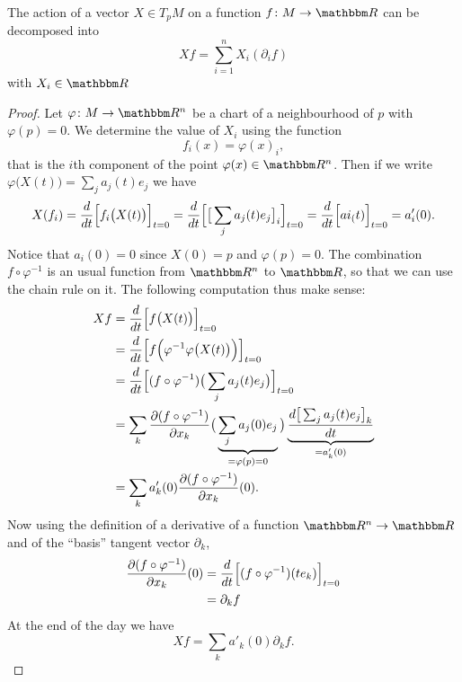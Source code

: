 \begin{lemma}
    The action of a vector \( X\in T_pM\) on a function \( f\colon M\to \eR\) can be decomposed into
    \begin{equation}
        Xf=\sum_{i=1}^n X_i(\partial_if)
    \end{equation}
    with \( X_i\in\eR\)
\end{lemma}

\begin{proof}
    Let \( \varphi\colon M\to \eR^n\) be a chart of a neighbourhood of \( p\) with \( \varphi(p)=0\). We determine the value of \( X_i\) using the function
    \begin{equation}
        f_i(x)=\varphi(x)_i,
    \end{equation}
    that is the \( i\)th component of the point \( \varphi(x)\in\eR^n\). Then if we write \( \varphi\big( X(t) \big)=\sum_j a_j(t)e_j\) we have
    \begin{subequations}
        \begin{align}
            X(f_i)=\frac{d}{dt}\Big[ f_i\big( X(t) \big) \Big]_{t=0}=\frac{d}{dt}\Big[ \big[ \sum_ja_j(t)e_j \big]_i \Big]_{t=0}=\frac{d}{dt}\Big[ ai_(t) \Big]_{t=0}=a_i'(0).
        \end{align}
    \end{subequations}
    Notice that \( a_i(0)=0\) since \( X(0)=p\) and \( \varphi(p)=0\). The combination \( f\circ\varphi^{-1}\) is an usual function from \( \eR^n\) to \( \eR\), so that we can use the chain rule on it. The following computation thus make sense:
    \begin{subequations}
        \begin{align}
            Xf&=\frac{d}{dt}\Big[ f\big( X(t) \big) \Big]_{t=0}\\
            &=\frac{d}{dt}\Big[ f\Big( \varphi^{-1}\varphi\big( X(t) \big) \Big) \Big]_{t=0}\\
            &=\frac{d}{dt}\Big[ (f\circ\varphi^{-1})\big( \sum_ja_j(t)e_j \big) \Big]_{t=0}\\
            &=\sum_k \frac{ \partial (f\circ\varphi^{-1}) }{ \partial x_k }\big( \underbrace{\sum_ja_j(0)e_j}_{=\varphi(p)=0} \big)\underbrace{\frac{ d\big[ \sum_ja_j(t)e_j \big]_k  }{ dt }}_{=a'_k(0)}\\
            &=\sum_k a'_k(0)\frac{ \partial (f\circ\varphi^{-1}) }{ \partial x_k }(0).
        \end{align}
    \end{subequations}
    Now using the definition of a derivative of a function \( \eR^n\to \eR\) and of the ``basis'' tangent vector \( \partial_k\),
    \begin{subequations}
        \begin{align}
            \frac{ \partial (f\circ\varphi^{-1}) }{ \partial x_k }(0)&=\frac{d}{dt}\Big[ (f\circ\varphi^{-1})(te_k) \Big]_{t=0}\\
            &=\partial_k f
        \end{align}
    \end{subequations}
   At the end of the day we have
   \begin{equation}
       Xf=\sum_k a'_k(0)\partial_kf.
   \end{equation}
\end{proof}

